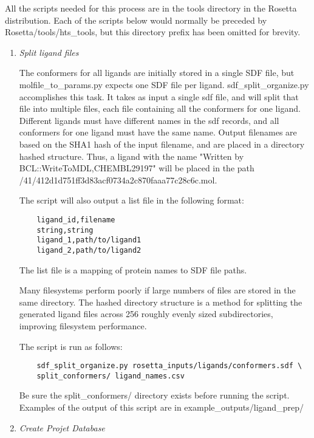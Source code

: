 All the scripts needed for this process are in the tools directory in the Rosetta distribution. 
Each of the scripts below would normally be preceded by Rosetta/tools/hts\_tools, but this directory prefix has been omitted for brevity.

\begin{enumerate}
\def\labelenumi{\arabic{enumi}.}
\item
	\emph{Split ligand files}

	The conformers for all ligands are initially stored in a single \ac{SDF} file, but molfile\_to\_params.py expects one \ac{SDF} file per ligand.
	sdf\_split\_organize.py accomplishes this task. 
	It takes as input a single sdf file, and will split that file into multiple files, each file containing all the conformers for one ligand.
	Different ligands must have different names in the sdf records, and all conformers for one ligand must have the same name. 
	Output filenames are based on the SHA1 hash of the input filename, and are placed in a directory hashed structure.
	Thus, a ligand with the name "Written by BCL::WriteToMDL,CHEMBL29197" will be placed in the path\\
	 /41/412d1d751ff3d83acf0734a2c870faaa77c28c6c.mol.

	The script will also output a list file in the following format:

	\begin{verbatim}
	ligand_id,filename
	string,string
	ligand_1,path/to/ligand1
	ligand_2,path/to/ligand2
	\end{verbatim}

	The list file is a mapping of protein names to \ac{SDF} file paths.

	Many filesystems perform poorly if large numbers of files are stored in the same directory.
	The hashed directory structure is a method for splitting the generated ligand files across 256 roughly evenly sized subdirectories, improving filesystem performance.

	The script is run as follows:

	\begin{verbatim}
	sdf_split_organize.py rosetta_inputs/ligands/conformers.sdf \
	split_conformers/ ligand_names.csv
	\end{verbatim}

	Be sure the split\_conformers/ directory exists before running the script.
	Examples of the output of this script are in example\_outputs/ligand\_prep/
\item
	\emph{Create Projet Database}


\end{enumerate}
